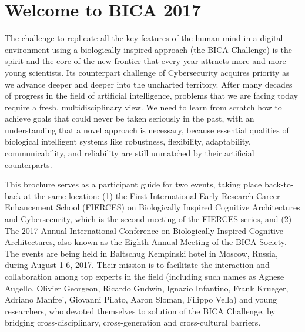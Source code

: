 \documentclass[10pt,fleqn,openany]{book} %
\begin{document}

\pagestyle{empty} %

\tableofcontents %

\pagestyle{fancy}



\chapter{Welcome to BICA 2017}

The challenge to replicate all the key features of the human mind in a digital environment using a biologically inspired approach (the BICA Challenge) is the spirit and the core of the new frontier that every year attracts more and more young scientists. Its counterpart challenge of Cybersecurity acquires priority as we advance deeper and deeper into the uncharted territory. After many decades of progress in the field of artificial intelligence, problems that we are facing today require a fresh, multidisciplinary view. We need to learn from scratch how to achieve goals that could never be taken seriously in the past, with an understanding that a novel approach is necessary, because essential qualities of biological intelligent systems like robustness, flexibility, adaptability, communicability, and reliability are still unmatched by their artificial counterparts.

This brochure serves as a participant guide for two events, taking place back-to-back at the same location: (1) the First International Early Research Career Enhancement School (FIERCES) on Biologically Inspired Cognitive Architectures and Cybersecurity, which is the second meeting of the FIERCES series, and (2) The 2017 Annual International Conference on Biologically Inspired Cognitive Architectures, also known as the Eighth Annual Meeting of the BICA Society. The events are being held in Baltschug Kempinski hotel in Moscow, Russia, during August 1-6, 2017. Their mission is to facilitate the interaction and collaboration among top experts in the field (including such names as Agnese Augello, Olivier Georgeon, Ricardo Gudwin, Ignazio Infantino, Frank Krueger, Adriano Manfre', Giovanni Pilato, Aaron Sloman, Filippo Vella) and young researchers, who devoted themselves to solution of the BICA Challenge, by bridging cross-disciplinary, cross-generation and cross-cultural barriers.
\end{document}
